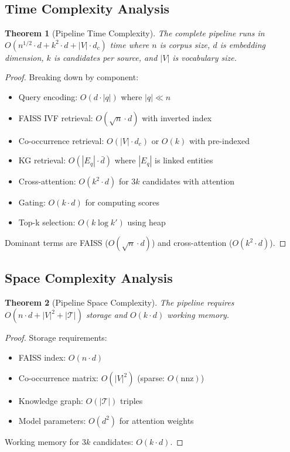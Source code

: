 \documentclass[10pt,twocolumn]{article}
\newtheorem{theorem}{Theorem}
\begin{document}
\subsection{Time Complexity Analysis}

\begin{theorem}[Pipeline Time Complexity]
\label{thm:time}
The complete pipeline runs in $O(n^{1/2} \cdot d + k^2 \cdot d + |V| \cdot d_c)$ time where $n$ is corpus size, $d$ is embedding dimension, $k$ is candidates per source, and $|V|$ is vocabulary size.
\end{theorem}

\begin{proof}
Breaking down by component:
\begin{itemize}
    \item Query encoding: $O(d \cdot |q|)$ where $|q| \ll n$
    \item FAISS IVF retrieval: $O(\sqrt{n} \cdot d)$ with inverted index
    \item Co-occurrence retrieval: $O(|V| \cdot d_c)$ or $O(k)$ with pre-indexed
    \item KG retrieval: $O(|E_q| \cdot \bar{d})$ where $|E_q|$ is linked entities
    \item Cross-attention: $O(k^2 \cdot d)$ for $3k$ candidates with attention
    \item Gating: $O(k \cdot d)$ for computing scores
    \item Top-k selection: $O(k \log k')$ using heap
\end{itemize}
Dominant terms are FAISS ($O(\sqrt{n} \cdot d)$) and cross-attention ($O(k^2 \cdot d)$).
\end{proof}

\subsection{Space Complexity Analysis}

\begin{theorem}[Pipeline Space Complexity]
\label{thm:space}
The pipeline requires $O(n \cdot d + |V|^2 + |\mathcal{T}|)$ storage and $O(k \cdot d)$ working memory.
\end{theorem}

\begin{proof}
Storage requirements:
\begin{itemize}
    \item FAISS index: $O(n \cdot d)$
    \item Co-occurrence matrix: $O(|V|^2)$ (sparse: $O(\text{nnz})$)
    \item Knowledge graph: $O(|\mathcal{T}|)$ triples
    \item Model parameters: $O(d^2)$ for attention weights
\end{itemize}
Working memory for $3k$ candidates: $O(k \cdot d)$.
\end{proof}
\end{document}
